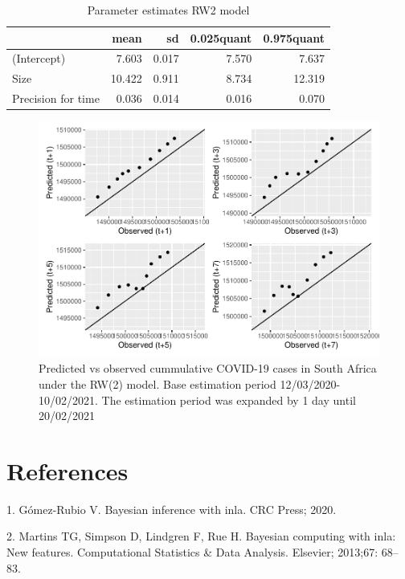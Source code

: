 \documentclass[10pt,letterpaper]{article}
\begin{document}
\begin{table}[!h]
	
	\caption{\label{tab:unnamed-chunk-11}Parameter estimates RW2 model}
	\centering
	\begin{tabular}[t]{l|r|r|r|r}
		\hline
		& mean & sd & 0.025quant & 0.975quant\\
		\hline
		(Intercept) & 7.603 & 0.017 & 7.570 & 7.637\\
		\hline
		Size & 10.422 & 0.911 & 8.734 & 12.319\\
		\hline
		Precision for time & 0.036 & 0.014 & 0.016 & 0.070\\
		\hline
	\end{tabular}
\end{table}

\begin{figure}[H]
	\includegraphics[width=0.99\linewidth]{COVIDincidenceSA_files/figure-latex/accuracy-1} \caption{Predicted vs observed cummulative COVID-19 cases in South Africa under the RW(2) model. Base estimation period 12/03/2020-10/02/2021. The estimation period was expanded by 1 day until 20/02/2021}\label{fig:accuracy}
\end{figure}

\hypertarget{references}{%
\section*{References}\label{references}}

\hypertarget{refs}{}
\leavevmode\hypertarget{ref-gomez2020bayesian}{}%
1. Gómez-Rubio V. Bayesian inference with inla. CRC Press; 2020.

\leavevmode\hypertarget{ref-martins2013bayesian}{}%
2. Martins TG, Simpson D, Lindgren F, Rue H. Bayesian computing with
inla: New features. Computational Statistics \& Data Analysis. Elsevier;
2013;67: 68--83.

\nolinenumbers
\end{document}
